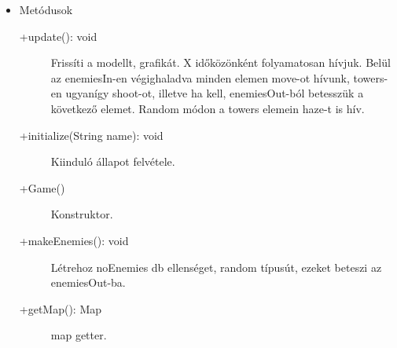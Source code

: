 \begin{itemize}
\begin{description}
		
	\end{description}
\item Metódusok\\
	\begin{description}
		\item[+update(): void] Frissíti a modellt, grafikát. X időközönként folyamatosan hívjuk. Belül az enemiesIn-en végighaladva minden elemen move-ot hívunk, towers-en ugyanígy shoot-ot, illetve ha kell, enemiesOut-ból betesszük a következő elemet. Random módon a towers elemein haze-t is hív. 
\item[+initialize(String name): void] Kiinduló állapot felvétele. 
\item[+Game()] Konstruktor. 
\item[+makeEnemies(): void] Létrehoz noEnemies db ellenséget, random típusút, ezeket beteszi az enemiesOut-ba. 
\item[+getMap(): Map] map getter.

		
		
	\end{description}
\end{itemize}

